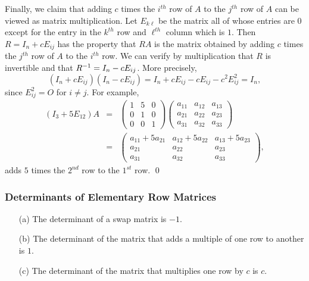 Finally, we claim that adding $c$ times the $i^{th}$ row of $A$
to the $j^{th}$ row of $A$ can be viewed as matrix
multiplication.  Let $E_{k\ell}$ be the matrix all of whose
entries are $0$ except for the entry in the $k^{th}$ row and
$\ell^{th}$ column which is $1$.  Then $R=I_n+cE_{ij}$ has the
property that $RA$ is the matrix obtained by adding $c$ times
the $j^{th}$ row of $A$ to the $i^{th}$ row.  We can verify by
multiplication that $R$ is invertible and that
$R^{-1}=I_n-cE_{ij}$.  More precisely,
\[
(I_n+cE_{ij})(I_n-cE_{ij})=I_n+cE_{ij}-cE_{ij}-c^2E_{ij}^2=I_n,
\]
since $E_{ij}^2 = O$ for $i\not= j$.  For example,
\begin{eqnarray*}
(I_3 + 5E_{12})A &  = & \left(\begin{array}{ccc} 1 & 5 & 0\\ 0 & 1 & 0 \\ 0 & 0 & 1\end{array}\right)
\left(\begin{array}{ccc} a_{11} & a_{12} & a_{13}\\ a_{21} & a_{22} & a_{23}
 \\ a_{31} & a_{32} & a_{33} \end{array}\right) \\ & = & 
\left(\begin{array}{ccc} a_{11}+5a_{21} & a_{12}+5a_{22} & a_{13}+5a_{23} \\ 
a_{21} & a_{22} & a_{23} \\ a_{31} & a_{32} & a_{33} \end{array}\right),
\end{eqnarray*}
adds $5$ times the $2^{nd}$ row to the $1^{st}$ row.   \qed

\subsubsection*{Determinants of Elementary Row Matrices}

\begin{lemma}  \label{L:detelemrowmat}
\begin{itemize}
\item[(a)] The determinant of a swap matrix is $-1$.
\item[(b)] The determinant of the matrix that adds a multiple
of one row to another is $1$.
\item[(c)] The determinant of the matrix that multiplies one
row by $c$ is $c$.
\end{itemize}
\end{lemma}  
 
